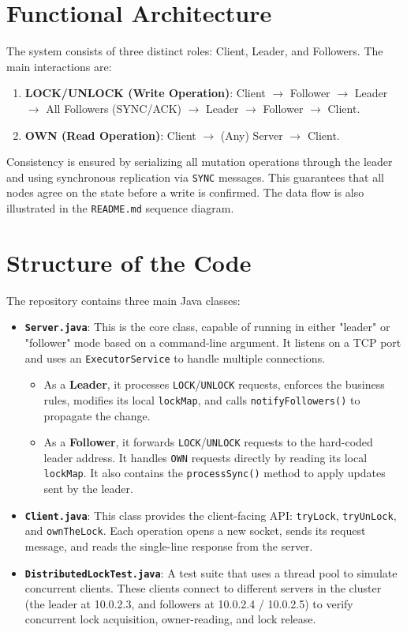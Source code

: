 \documentclass[a4paper,11pt]{article}
\begin{document}
\section{Functional Architecture}
The system consists of three distinct roles: Client, Leader, and Followers. The main interactions are:

\begin{enumerate}
    \item \textbf{LOCK/UNLOCK (Write Operation)}: Client $\rightarrow$ Follower $\rightarrow$ Leader $\rightarrow$ All Followers (SYNC/ACK) $\rightarrow$ Leader $\rightarrow$ Follower $\rightarrow$ Client.
    \item \textbf{OWN (Read Operation)}: Client $\rightarrow$ (Any) Server $\rightarrow$ Client.
\end{enumerate}

Consistency is ensured by serializing all mutation operations through the leader and using synchronous replication via \texttt{SYNC} messages. This guarantees that all nodes agree on the state before a write is confirmed. The data flow is also illustrated in the \texttt{README.md} sequence diagram.

\section{Structure of the Code}
The repository contains three main Java classes:
\begin{itemize}
    \item \textbf{\texttt{Server.java}}: This is the core class, capable of running in either "leader" or "follower" mode based on a command-line argument. It listens on a TCP port and uses an \texttt{ExecutorService} to handle multiple connections.
        \begin{itemize}
            \item As a \textbf{Leader}, it processes \texttt{LOCK}/\texttt{UNLOCK} requests, enforces the business rules, modifies its local \texttt{lockMap}, and calls \texttt{notifyFollowers()} to propagate the change.
            \item As a \textbf{Follower}, it forwards \texttt{LOCK}/\texttt{UNLOCK} requests to the hard-coded leader address. It handles \texttt{OWN} requests directly by reading its local \texttt{lockMap}. It also contains the \texttt{processSync()} method to apply updates sent by the leader.
        \end{itemize}
    \item \textbf{\texttt{Client.java}}: This class provides the client-facing API: \texttt{tryLock}, \texttt{tryUnLock}, and \texttt{ownTheLock}. Each operation opens a new socket, sends its request message, and reads the single-line response from the server.
    \item \textbf{\texttt{DistributedLockTest.java}}: A test suite that uses a thread pool to simulate concurrent clients. These clients connect to different servers in the cluster (the leader at 10.0.2.3, and followers at 10.0.2.4 / 10.0.2.5) to verify concurrent lock acquisition, owner-reading, and lock release.
\end{itemize}
\end{document}
